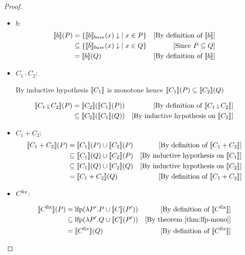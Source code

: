 \documentclass[
  10pt,       %
  twoside,    %
  a4paper,    %
  english,    %
  tikz,       %
  openright,  %
]{book}
\begin{document}
\begin{definition}
\begin{proof}
\begin{itemize}
      \item $b$:
        \begin{align*}
          \llbracket b \rrbracket(P) 
            &= \{ \llbracket b \rrbracket_{base}(x)\downarrow \; \mid x \in P \} 
            & \text{[By definition of $\llbracket b \rrbracket$]}\\
            &\subseteq \{ \llbracket b \rrbracket_{base}(x)\downarrow \; \mid x \in Q \} 
            & \text{[Since $P \subseteq Q$]}\\
            &= \llbracket b \rrbracket(Q) 
            & \text{[By definition of $\llbracket b \rrbracket$]}\\
        \end{align*}

      \item $C_1 \fcmp C_2$:

        By inductive hypothesis $\llbracket C_1 \rrbracket$ is monotone hence
        $\llbracket C_1 \rrbracket(P) \subseteq \llbracket C_2 \rrbracket(Q)$

        \begin{align*}
          \sem{C_1 \fcmp C_2}(P) 
            &= \sem{C_2}(\sem{C_1}(P))
            &\text{[By definition of $\sem{C_1 \fcmp C_2}$]}\\
            &\subseteq \sem{C_2}(\sem{C_1}(Q))
            &\text{[By inductive hypothesis on $\sem{C_2}$]} \\
        \end{align*}
    
      \item $C_1 + C_2$:
        \begin{align*}
          \llbracket C_1 + C_2 \rrbracket(P) 
            &= \llbracket C_1 \rrbracket(P) \cup \llbracket C_2 \rrbracket(P)
            &\text{[By definition of $\llbracket C_1 + C_2 \rrbracket$]}\\
            &\subseteq \llbracket C_1 \rrbracket(Q) \cup \llbracket C_2 \rrbracket(P)
            &\text{[By inductive hypothesis on $\llbracket C_1 \rrbracket$]} \\
            &\subseteq \llbracket C_1 \rrbracket(Q) \cup \llbracket C_2 \rrbracket(Q)
            &\text{[By inductive hypothesis on $\llbracket C_2 \rrbracket$]} \\
            &= \llbracket C_1 + C_2 \rrbracket(Q) 
            &\text{[By definition of $\llbracket C_1 + C_2 \rrbracket$]}\\
        \end{align*}
      
      \item $C^{\mathrm{fix}}$:

        \begin{align*}
          \llbracket C^{\mathrm{fix}} \rrbracket(P) 
            &= \mathrm{lfp}(\lambda P'. P \cup \llbracket C \rrbracket(P'))
            &\text{[By definition of $\llbracket C^{\mathrm{fix}} \rrbracket$]}\\
            &\subseteq \mathrm{lfp}(\lambda P'. Q \cup \llbracket C \rrbracket(P'))
            &\text{[By theorem \ref{thm:lfp-mono}]}\\
            &= \llbracket C^{\mathrm{fix}} \rrbracket(Q) 
            &\text{[By definition of $\llbracket C^{\mathrm{fix}} \rrbracket$]}\\
        \end{align*}
        

\end{itemize}
\end{proof}
\end{definition}
\end{document}
